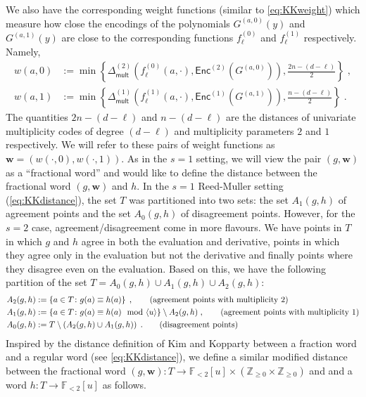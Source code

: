 \documentclass{theoretics}
\def\Integer{\mathbb{Z}}
\def\Field{\mathbb{F}}
\let\Z\Integer
\let\F\Field
\def\vecw{\mathbf{w}}
\newcommand{\enc}{{\mathsf{Enc}}}
\newcommand{\vw}{\vecw}
\begin{document}
	We also have the corresponding weight
	functions (similar to \eqref{eq:KKweight}) which measure how close the encodings of the polynomials $G^{(a,0)}(y)$
	and $G^{(a,1)}(y)$ are close to the corresponding functions $f_\ell^{(0)}$
	and $f_\ell^{(1)}$ respectively. Namely, 
	\begin{align*}
		w(a,0) &:=
		\min\left\{{\Delta_{\mathsf{mult}}^{(2)}\left(f^{(0)}_{\ell}(a,
			\cdot) , \enc^{(2)}(G^{(a,0)}) \right)},
		{\frac{2n-(d-\ell)}{2}}  \right\}\;,\\
		w(a,1) &:=
		\min\left\{{\Delta_{\mathsf{mult}}^{(1)}\left(f^{(1)}_{\ell}(a, \cdot), \enc^{(1)}(G^{(a,1)})
			\right)}, {\frac{n-(d-\ell)}{2}}
		\right\}\;.
	\end{align*}
	The quantities $2n-(d-\ell)$ and $n-(d-\ell)$ are the distances of
	univariate multiplicity codes of degree $(d-\ell)$ and multiplicity
	parameters $2$ and $1$ respectively. 
	We will refer to these pairs of weight functions as $\vw = (w(\cdot,0),
	w(\cdot,1))$. As in the $s=1$ setting, we will view the pair
	$(g,\vw)$ as a ``fractional word'' and would like to define the distance between the fractional word $(g,\vw)$ and $h$. In the $s=1$ Reed-Muller setting (\eqref{eq:KKdistance}), the set $T$ was partitioned into two sets: the set $A_1(g,h)$ of agreement points and the set $A_0(g,h)$ of disagreement points. However, for the $s=2$ case, agreement/disagreement come in more flavours. We have points in $T$ in which $g$ and $h$ agree in both the evaluation and derivative, points in which they agree only in the evaluation but not the derivative and finally points where they disagree even on the evaluation. Based on this, we have the following partition of the set $T= A_0(g,h) \cup A_1(g,h) \cup A_2(g,h)$:
	\begin{align*}
		A_2(g,h) &:= \left\{ a \in T \colon g(a) \equiv h(a) \right\}\;,
		\tag*{\text{(agreement points with multiplicity 2)}}\\
		A_1(g,h) &:=  \left\{ a \in T \colon g(a) \equiv h(a) \mod \langle u
		\rangle \right\} \setminus A_2(g,h)\;, \tag*{\text{(agreement points with multiplicity 1)}}\\
		A_0(g,h) &:=  T \setminus \left( A_2(g,h)    \cup
		A_1(g,h)\right)\;.  \tag*{\text{(disagreement points)}}   
	\end{align*}
	Inspired by the distance definition of Kim and Kopparty between a fraction
	word and a regular word (see \eqref{eq:KKdistance}), we define a
	similar modified distance between the fractional word $(g,\vw) \colon T \to
	\F_{<2}[u] \times (\Z_{\geq 0} \times \Z_{\geq 0})$ and and a word $h \colon T \to \F_{<2}[u]$ as
	follows. 
	
\end{document}
